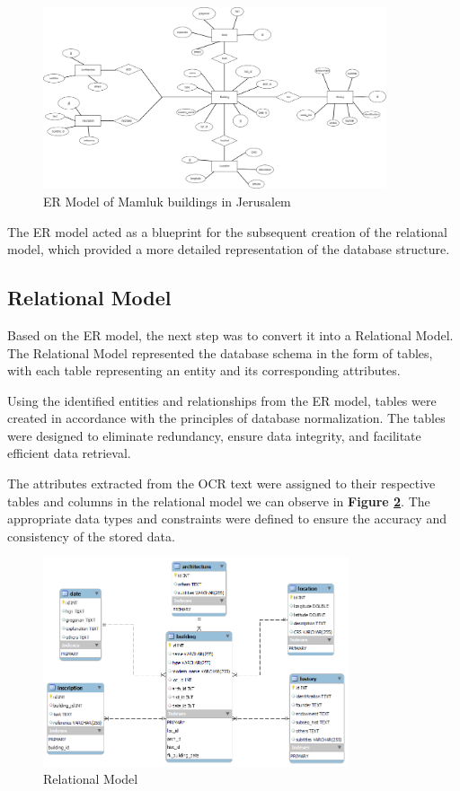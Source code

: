 \begin{figure}[H]
    \centering
    \includegraphics[width=0.9\textwidth]{Images/ER.png}
    \caption{ER Model of Mamluk buildings in Jerusalem}
    \label{fig:ER}
\end{figure}

The ER model acted as a blueprint for the subsequent creation of the relational model, which provided a more detailed representation of the database structure.

\subsection{Relational Model}
Based on the ER model, the next step was to convert it into a Relational Model. The Relational Model represented the database schema in the form of tables, with each table representing an entity and its corresponding attributes.

Using the identified entities and relationships from the ER model, tables were created in accordance with the principles of database normalization. The tables were designed to eliminate redundancy, ensure data integrity, and facilitate efficient data retrieval.

The attributes extracted from the OCR text were assigned to their respective tables and columns in the relational model we can observe in \textbf{Figure \ref{fig:rel_model}}.
The appropriate data types and constraints were defined to ensure the accuracy and consistency of the stored data. \\[0.3cm]

\begin{figure}[H]
    \centering
    \includegraphics[width=0.8\textwidth]{Images/Rel_model.png}
    \caption{Relational Model}
    \label{fig:rel_model}
\end{figure}

